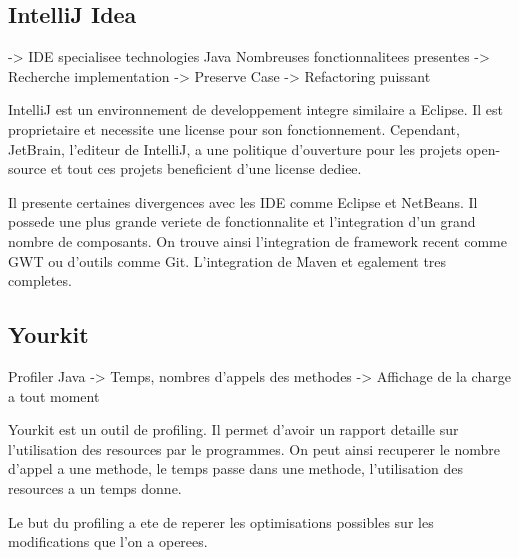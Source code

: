 \subsection{IntelliJ Idea}
-> IDE specialisee technologies Java
Nombreuses fonctionnalitees presentes
-> Recherche implementation 
-> Preserve Case
-> Refactoring puissant

IntelliJ est un environnement de developpement integre similaire a Eclipse. Il est proprietaire et necessite une license pour son fonctionnement. Cependant, JetBrain, l'editeur de IntelliJ, a une politique d'ouverture pour les projets open-source et tout ces projets beneficient d'une license dediee. 

Il presente certaines divergences avec les IDE comme Eclipse et NetBeans. Il possede une plus grande veriete de fonctionnalite et l'integration d'un grand nombre de composants. On trouve ainsi l'integration de framework recent comme GWT ou d'outils comme Git. L'integration de Maven et egalement tres completes. 
\subsection{Yourkit}
Profiler Java
-> Temps, nombres d'appels des methodes
-> Affichage de la charge a tout moment

Yourkit est un outil de profiling. Il permet d'avoir un rapport detaille sur l'utilisation des resources par le programmes. On peut ainsi recuperer le nombre d'appel a une methode, le temps passe dans une methode, l'utilisation des resources a un temps donne.

Le but du profiling a ete de reperer les optimisations possibles sur les modifications que l'on a operees.